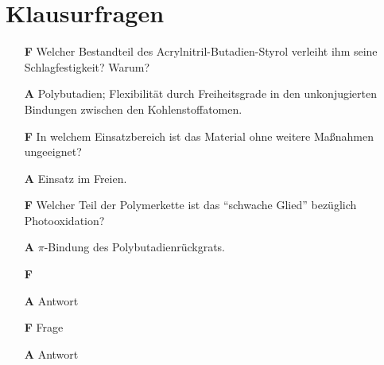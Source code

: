 \chapter{Klausurfragen}
    \begin{itemize}
        \item[\textbf{F}] Welcher Bestandteil des Acrylnitril-Butadien-Styrol verleiht ihm seine Schlagfestigkeit? Warum?
        \item[\textbf{A}] Polybutadien; Flexibilität durch Freiheitsgrade in den unkonjugierten Bindungen zwischen den Kohlenstoffatomen.
        \vspace{4mm}
        \item[\textbf{F}] In welchem Einsatzbereich ist das Material ohne weitere Maßnahmen ungeeignet?
        \item[\textbf{A}] Einsatz im Freien.
        \vspace{4mm}
        \item[\textbf{F}] Welcher Teil der Polymerkette ist das \enquote{schwache Glied} bezüglich Photooxidation?
        \item[\textbf{A}] \(\pi\)-Bindung des Polybutadienrückgrats.
        \vspace{4mm}
        \item[\textbf{F}] 
        \item[\textbf{A}] Antwort
        \vspace{4mm}
        \item[\textbf{F}] Frage
        \item[\textbf{A}] Antwort
    \end{itemize}